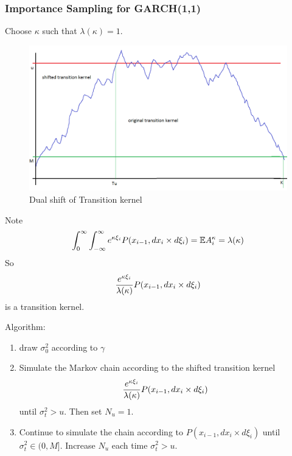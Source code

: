 \documentclass{beamer}
\begin{document}
\begin{frame}
  \frametitle{Importance Sampling for GARCH(1,1)}
  Choose $\kappa$ such that $\lambda(\kappa) = 1$.
  \begin{minipage}[t]{0.55\linewidth}
    \begin{figure}
      \centering
      \includegraphics[width=1.0\linewidth]{pic1.png}
      \caption{Dual shift of Transition kernel}
      \label{fig:dual_measure}
    \end{figure}
    \begin{scriptsize}
      Note
      \[
      \int_0^\infty \int_{-\infty}^{\infty}
      e^{\kappa \xi_i}
      P(x_{i-1}, d x_{i} \times d\xi_{i})
      = \mathbb{E} A_i^\kappa = \lambda(\kappa)
      \]
      So
      \[
      {e^{\kappa \xi_i} \over \lambda(\kappa)}
      P(x_{i-1}, d x_{i} \times d\xi_{i})
      \]
      is a transition kernel.
    \end{scriptsize}
  \end{minipage}\hfill
  \begin{minipage}[t]{0.4\linewidth}
    \begin{scriptsize}
      Algorithm:
      \begin{enumerate}
      \item draw $\sigma_0^2$ according to $\gamma$
      \item Simulate the Markov chain according to the shifted transition
        kernel
        \[
        {e^{\kappa \xi_i} \over \lambda(\kappa)}
        P(x_{i-1}, d x_{i} \times d\xi_{i})
        \]
        until $\sigma_t^2 > u$. Then set $N_u = 1$.
      \item Continue to simulate the chain according to $P(x_{i-1}, d
        x_{i} \times d\xi_{i})$ until $\sigma_t^2 \in (0, M]$. Increase $N_u$
        each time $\sigma_t^2 > u$.
      \end{enumerate}
    \end{scriptsize}
  \end{minipage}
\end{frame}
\end{document}
